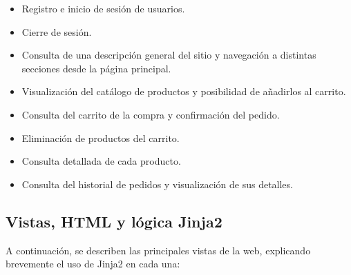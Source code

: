 \documentclass[10pt]{book}
\begin{document}
\begin{itemize}
    \item Registro e inicio de sesión de usuarios.
    \item Cierre de sesión.
    \item Consulta de una descripción general del sitio y navegación a distintas secciones desde la página principal.
    \item Visualización del catálogo de productos y posibilidad de añadirlos al carrito.
    \item Consulta del carrito de la compra y confirmación del pedido.
    \item Eliminación de productos del carrito.
    \item Consulta detallada de cada producto.
    \item Consulta del historial de pedidos y visualización de sus detalles.
\end{itemize}
\subsection{Vistas, HTML y lógica Jinja2}

A continuación, se describen las principales vistas de la web, explicando brevemente el uso de Jinja2 en cada una:
\end{document}
